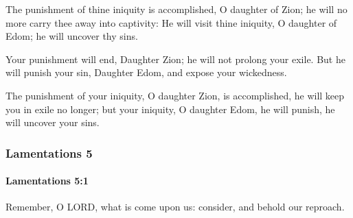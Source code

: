 			\begin{versebox}
					\item[BHS] 
					\item[LXX] 
					\item[ASV] The punishment of thine iniquity is accomplished, O daughter of Zion; he will no more carry thee away into captivity: He will visit thine iniquity, O daughter of Edom; he will uncover thy sins.
					\item[NIV] Your punishment will end, Daughter Zion; he will not prolong your exile. But he will punish your sin, Daughter Edom, and expose your wickedness.
					\item[NRSV] The punishment of your iniquity, O daughter Zion, is accomplished, he will keep you in exile no longer; but your iniquity, O daughter Edom, he will punish, he will uncover your sins.
			\end{versebox}
	\subsubsection{Lamentations 5} %
		\label{LAMENTATIONS-5}

		\paragraph{Lamentations 5:1} %
			\label{LAMENTATIONS-5-1}

			Remember, O LORD, what is come upon us: consider, and behold our reproach.

